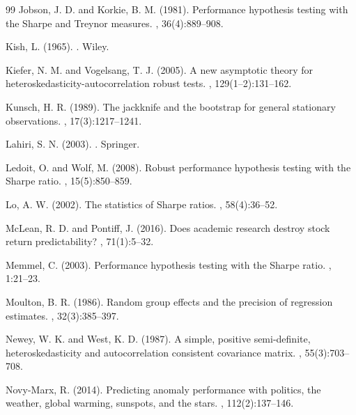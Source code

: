 \documentclass[12pt,a4paper]{article}
\begin{document}
\begin{thebibliography}{99}
Jobson, J. D. and Korkie, B. M. (1981).
\newblock Performance hypothesis testing with the Sharpe and Treynor measures.
, 36(4):889--908.

Kish, L. (1965).
.
\newblock Wiley.

Kiefer, N. M. and Vogelsang, T. J. (2005).
\newblock A new asymptotic theory for heteroskedasticity-autocorrelation robust tests.
, 129(1--2):131--162.

Kunsch, H. R. (1989).
\newblock The jackknife and the bootstrap for general stationary observations.
, 17(3):1217--1241.

Lahiri, S. N. (2003).
.
\newblock Springer.

Ledoit, O. and Wolf, M. (2008).
\newblock Robust performance hypothesis testing with the Sharpe ratio.
, 15(5):850--859.

Lo, A. W. (2002).
\newblock The statistics of Sharpe ratios.
, 58(4):36--52.

McLean, R. D. and Pontiff, J. (2016).
\newblock Does academic research destroy stock return predictability?
, 71(1):5--32.

Memmel, C. (2003).
\newblock Performance hypothesis testing with the Sharpe ratio.
, 1:21--23.

Moulton, B. R. (1986).
\newblock Random group effects and the precision of regression estimates.
, 32(3):385--397.

Newey, W. K. and West, K. D. (1987).
\newblock A simple, positive semi-definite, heteroskedasticity and
autocorrelation consistent covariance matrix.
, 55(3):703--708.

Novy-Marx, R. (2014).
\newblock Predicting anomaly performance with politics, the weather, global warming, sunspots, and the stars.
, 112(2):137--146.


\end{thebibliography}
\end{document}
